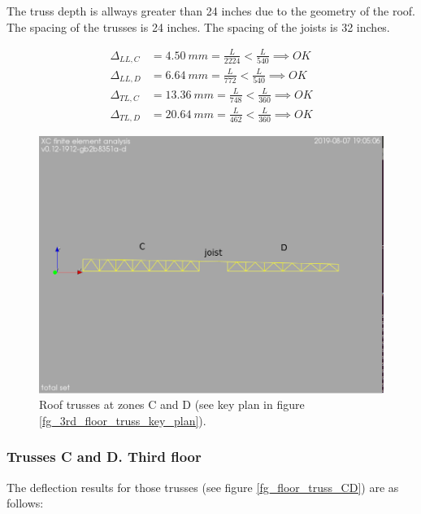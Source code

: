 \noindent The truss depth is allways greater than 24 inches due to the geometry of the roof. The spacing of the trusses is 24 inches. The spacing of the joists is 32 inches. 

\begin{align}
\Delta_{LL,C} &= 4.50\ mm= \frac{L}{2224} < \frac{L}{540} \implies OK \\
\Delta_{LL,D} &= 6.64\ mm= \frac{L}{772} < \frac{L}{540} \implies OK \\
\Delta_{TL,C} &= 13.36\ mm= \frac{L}{748} < \frac{L}{360} \implies OK \\
\Delta_{TL,D} &= 20.64\ mm= \frac{L}{462} < \frac{L}{360} \implies OK
\end{align}

\begin{figure}
  \begin{center}
  \includegraphics[width=120mm]{figures/trusses/roof_truss_CD}
  \end{center}
  \caption{Roof trusses at zones C and D (see key plan in figure \ref{fg_3rd_floor_truss_key_plan}).}\label{fg_roof_truss_CD}
\end{figure}

\subsubsection{Trusses C and D. Third floor}
The deflection results for those trusses (see figure \ref{fg_floor_truss_CD}) are as follows:

